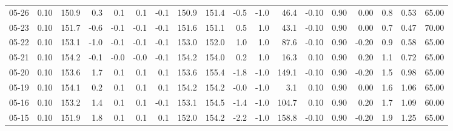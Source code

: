 \begin{threeparttable}
{\begin{tabular}{lrrrrrrrrrrrrrrrrr}
  05-26 &     0.10 & 150.9 &               0.3 &               0.1 &                0.1 &               -0.1 & 150.9 & 151.4 &       -0.5 &                     -1.0 &                46.4 &      -0.10 &      0.90 &           0.00 &              0.8 &            0.53 &                  65.00 \\
  05-23 &     0.10 & 151.7 &              -0.6 &              -0.1 &               -0.1 &               -0.1 & 151.6 & 151.1 &        0.5 &                      1.0 &                43.1 &      -0.10 &      0.90 &           0.00 &              0.7 &            0.47 &                  70.00 \\
  05-22 &     0.10 & 153.1 &              -1.0 &              -0.1 &               -0.1 &               -0.1 & 153.0 & 152.0 &        1.0 &                      1.0 &                87.6 &      -0.10 &      0.90 &          -0.20 &              0.9 &            0.58 &                  65.00 \\
  05-21 &     0.10 & 154.2 &              -0.1 &              -0.0 &               -0.0 &               -0.1 & 154.2 & 154.0 &        0.2 &                      1.0 &                16.3 &       0.10 &      0.90 &           0.20 &              1.1 &            0.72 &                  65.00 \\
  05-20 &     0.10 & 153.6 &               1.7 &               0.1 &                0.1 &                0.1 & 153.6 & 155.4 &       -1.8 &                     -1.0 &               149.1 &      -0.10 &      0.90 &          -0.20 &              1.5 &            0.98 &                  65.00 \\
  05-19 &     0.10 & 154.1 &               0.2 &               0.1 &                0.1 &                0.1 & 154.2 & 154.2 &       -0.0 &                     -1.0 &                 3.1 &       0.10 &      0.90 &           0.00 &              1.6 &            1.06 &                  65.00 \\
  05-16 &     0.10 & 153.2 &               1.4 &               0.1 &                0.1 &               -0.1 & 153.1 & 154.5 &       -1.4 &                     -1.0 &               104.7 &       0.10 &      0.90 &           0.20 &              1.7 &            1.09 &                  60.00 \\
  05-15 &     0.10 & 151.9 &               1.8 &               0.1 &                0.1 &                0.1 & 152.0 & 154.2 &       -2.2 &                     -1.0 &               158.8 &      -0.10 &      0.90 &          -0.20 &              1.9 &            1.25 &                  65.00 \\

\end{tabular}}
\end{threeparttable}
